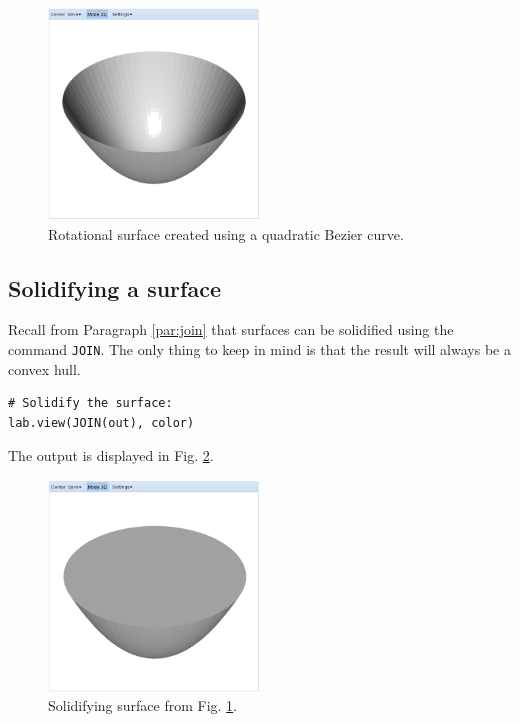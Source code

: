 \documentclass[article,A4,12pt]{llncs}
\begin{document}
\begin{figure}[!ht]
\begin{center}
\includegraphics[width=0.5\textwidth]{img/curves-4.png}
\end{center}
\vspace{-2mm}
\caption{Rotational surface created using a quadratic Bezier curve.}
\label{fig:curves-4}
\end{figure}


\subsection{Solidifying a surface}

Recall from Paragraph \ref{par:join} that surfaces can be solidified
using the command {\tt JOIN}. The only thing to keep in mind is that 
the result will always be a convex hull.  

\begin{verbatim}
# Solidify the surface:
lab.view(JOIN(out), color)
\end{verbatim}
The output is displayed in Fig. \ref{fig:curves-5}.

\begin{figure}[!ht]
\begin{center}
\includegraphics[width=0.5\textwidth]{img/curves-5.png}
\end{center}
\vspace{-2mm}
\caption{Solidifying surface from Fig. \ref{fig:curves-4}.}
\label{fig:curves-5}
\end{figure}
\end{document}
